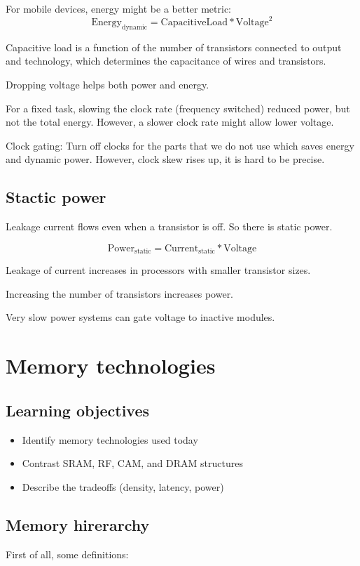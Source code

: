 \documentclass[letterpaper,12pt]{article}
\begin{document}
For mobile devices, energy might be a better metric:
\[
    \text{Energy}_{\text{dynamic}}=\text{CapacitiveLoad}*\text{Voltage}^2
\]

Capacitive load is a function of the number of transistors connected to output and technology, which determines the capacitance of wires and transistors.

Dropping voltage helps both power and energy.

For a fixed task, slowing the clock rate (frequency switched) reduced power, but not the total energy. However, a slower clock rate might allow lower voltage.

Clock gating: Turn off clocks for the parts that we do not use which saves energy and dynamic power. However, clock skew rises up, it is hard to be precise.

\subsection{Stactic power}

Leakage current flows even when a transistor is off. So there is static power.

\[
    \text{Power}_{\text{static}}=\text{Current}_\text{static}*\text{Voltage}
\]

Leakage of current increases in processors with smaller transistor sizes.

Increasing the number of transistors increases power.

Very slow power systems can gate voltage to inactive modules.

\section{Memory technologies}
\subsection{Learning objectives}
\begin{itemize}
    \item Identify memory technologies used today
    \item Contrast SRAM, RF, CAM, and DRAM structures
    \item Describe the tradeoffs (density, latency, power)
\end{itemize}
\subsection{Memory hirerarchy}
First of all, some definitions:
\end{document}
